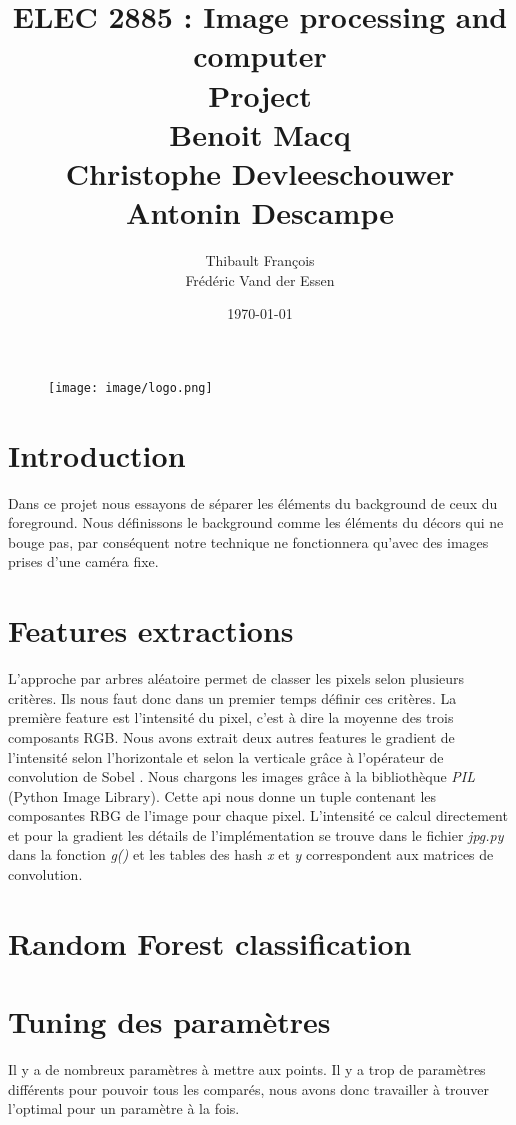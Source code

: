\documentclass[11pt,a4paper]{report}
\title{ELEC 2885 : Image processing and computer  \\ Project \\
Benoit Macq \\ Christophe Devleeschouwer \\ Antonin Descampe}
\author{Thibault François \\ Frédéric Vand der Essen}
\date{\today}
\begin{document}
	\begin{titlepage}		
		\begin{figure}[tbp]
			\begin{center}
				\texttt{[image: image/logo.png]}
			\end{center}
		\end{figure}
		\maketitle
	\end{titlepage}

\section{Introduction}
Dans ce projet nous essayons de séparer les éléments du background de ceux du foreground. Nous définissons le background comme les éléments du décors
qui ne bouge pas, par conséquent notre technique ne fonctionnera qu'avec des images prises d'une caméra fixe. 

\section{Features extractions}
L'approche par arbres aléatoire permet de classer les pixels selon plusieurs critères. Ils nous faut donc dans un premier temps définir ces critères. La première feature est l'intensité du pixel, c'est à dire la moyenne des trois composants RGB. Nous avons extrait deux autres features le gradient de l'intensité selon l'horizontale et selon la verticale \cite{gradient} grâce à l'opérateur de convolution de Sobel \cite{sobel}. Nous chargons les images grâce à la bibliothèque \textit{PIL} (Python Image Library). Cette api nous donne un tuple contenant les composantes RBG de l'image pour chaque pixel. L'intensité ce calcul directement et pour la gradient les détails de l'implémentation se trouve dans le fichier \textit{jpg.py} dans la fonction \textit{g()} et les tables des hash \textit{x} et \textit{y} correspondent aux matrices de convolution.  


\section{Random Forest classification}

\section{Tuning des paramètres}
Il y a de nombreux paramètres à mettre aux points. Il y a trop de paramètres différents pour pouvoir tous les comparés, nous avons donc travailler à trouver l'optimal pour un paramètre à la fois. 
\end{document}
